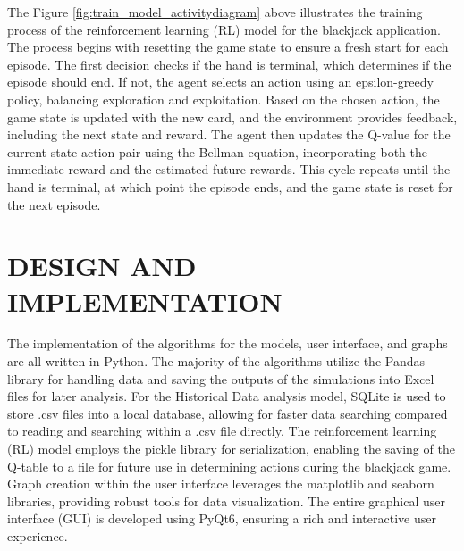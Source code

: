 \documentclass[a4paper,12pt]{report}
\begin{document}
The Figure \ref{fig:train_model_activitydiagram} above illustrates the training process of the reinforcement learning (RL) model for the blackjack application. The process begins with resetting the game state to ensure a fresh start for each episode. The first decision checks if the hand is terminal, which determines if the episode should end. If not, the agent selects an action using an epsilon-greedy policy, balancing exploration and exploitation. Based on the chosen action, the game state is updated with the new card, and the environment provides feedback, including the next state and reward. The agent then updates the Q-value for the current state-action pair using the Bellman equation, incorporating both the immediate reward and the estimated future rewards. This cycle repeats until the hand is terminal, at which point the episode ends, and the game state is reset for the next episode.

\chapter{DESIGN AND IMPLEMENTATION}
\label{design-and-implementation}
The implementation of the algorithms for the models, user interface, and graphs are all written in Python. The majority of the algorithms utilize the Pandas library for handling data and saving the outputs of the simulations into Excel files for later analysis. For the Historical Data analysis model, SQLite is used to store .csv files into a local database, allowing for faster data searching compared to reading and searching within a .csv file directly. The reinforcement learning (RL) model employs the pickle library for serialization, enabling the saving of the Q-table to a file for future use in determining actions during the blackjack game. Graph creation within the user interface leverages the matplotlib and seaborn libraries, providing robust tools for data visualization. The entire graphical user interface (GUI) is developed using PyQt6, ensuring a rich and interactive user experience.
\end{document}
